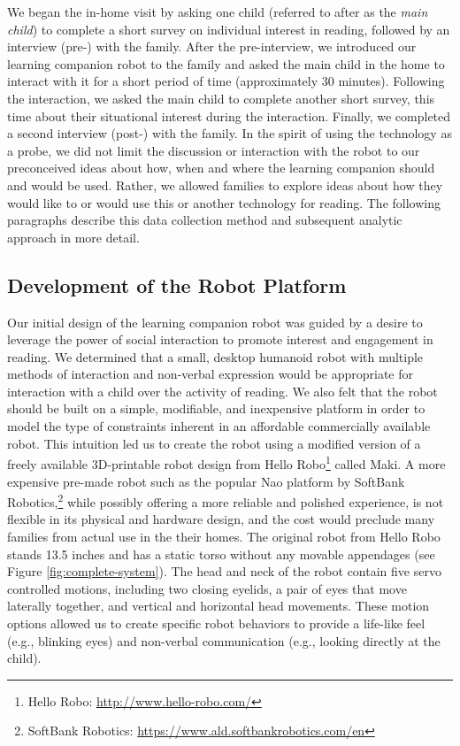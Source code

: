 \documentclass{sigchi}
\begin{document}
 
 We began the in-home visit by asking one child (referred to after as the \textit{main child}) to complete a short survey on individual interest in reading, followed by an interview (pre-) with the family. After the pre-interview, we introduced our learning companion robot to the family and asked the main child in the home to interact with it for a short period of time (approximately 30 minutes). Following the interaction, we asked the main child to complete another short survey, this time about their situational interest during the interaction. Finally, we completed a second interview (post-) with the family. In the spirit of using the technology as a probe, we did not limit the discussion or interaction with the robot to our preconceived ideas about how, when and where the learning companion should and would be used. Rather, we allowed families to explore ideas about how they would like to or would use this or another technology for reading. The following paragraphs describe this data collection method and subsequent analytic approach in more detail.
 
\subsection{Development of the Robot Platform}
Our initial design of the learning companion robot was guided by a desire to leverage the power of social interaction to promote interest and engagement in reading. We determined that a small, desktop humanoid robot with multiple methods of interaction and non-verbal expression would be appropriate for interaction with a child over the activity of reading. We also felt that the robot should be built on a simple, modifiable, and inexpensive platform in order to model the type of constraints inherent in an affordable commercially available robot. This intuition led us to create the robot using a modified version of a freely available 3D-printable robot design from Hello Robo\footnote{Hello Robo: \href{http://www.hello-robo.com/}{http://www.hello-robo.com/}} called Maki. A more expensive pre-made robot such as the popular Nao platform by SoftBank Robotics,\footnote{SoftBank Robotics: \href{https://www.ald.softbankrobotics.com/en}{https://www.ald.softbankrobotics.com/en}} while possibly offering a more reliable and polished experience, is not flexible in its physical and hardware design, and the cost would preclude many families from actual use in the their homes. The original robot from Hello Robo stands 13.5 inches and has a static torso without any movable appendages (see Figure \ref{fig:complete-system}). The head and neck of the robot contain five servo controlled motions, including two closing eyelids, a pair of eyes that move laterally together, and vertical and horizontal head movements. These motion options allowed us to create specific robot behaviors to provide a life-like feel (e.g., blinking eyes) and non-verbal communication (e.g., looking directly at the child). 
\end{document}
